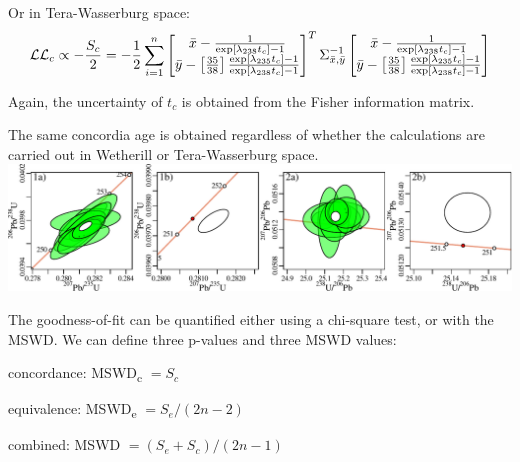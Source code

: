 \begin{refsection}
\begin{enumerate}
    Or in Tera-Wasserburg space:
        \begin{equation}
    \mathcal{LL}_c \propto - \frac{S_c}{2} =
      -\frac{1}{2}\sum\limits_{i=1}^{n}
    \left[
      \begin{array}{@{}c@{}}
        \bar{x} - \frac{1}{\exp[\lambda_{238}t_c] - 1}\\
        \bar{y} - \left[\frac{35}{38}\right]
        \frac{\exp[\lambda_{235}t_c] - 1}
             {\exp[\lambda_{238}t_c] - 1}
      \end{array}
      \right]^T
    \Sigma_{\bar{x},\bar{y}}^{-1}
    \left[
      \begin{array}{@{}c@{}}
        \bar{x} - \frac{1}{\exp[\lambda_{238}t_c] - 1}\\
        \bar{y} - \left[\frac{35}{38}\right]
        \frac{\exp[\lambda_{235}t_c] - 1}
             {\exp[\lambda_{238}t_c] - 1}
      \end{array}
      \right]
    \label{eq:concordiaAgeTW}
    \end{equation}

    Again, the uncertainty of $t_c$ is obtained from the Fisher
    information matrix.
    
\end{enumerate}

The same concordia age is obtained regardless of whether the
calculations are carried out in Wetherill or Tera-Wasserburg space.\\

\noindent\includegraphics[width=\textwidth]{../figures/concordia_age.pdf}
\begingroup {}\endgroup

The goodness-of-fit can be quantified either using a chi-square test,
or with the MSWD. We can define three p-values and three MSWD values:

\begin{description}
\item{concordance}: MSWD\textsubscript{c} $= S_c$
\item{equivalence}: MSWD\textsubscript{e} $= S_e/(2n-2)$
\item{combined}: MSWD $= (S_e + S_c)/(2n-1)$
\end{description}


\end{refsection}
